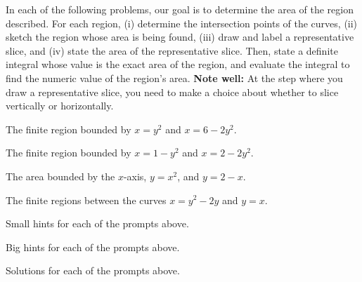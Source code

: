 \begin{activity} \label{A:6.1.2}  In each of the following problems, our goal is to determine the area of the region described.  For each region, (i) determine the intersection points of the curves, (ii) sketch the region whose area is being found, (iii) draw and label a representative slice, and (iv) state the area of the representative slice.  Then, state a definite integral whose value is the exact area of the region, and evaluate the integral to find the numeric value of the region's area.  {\bf Note well:} At the step where you draw a representative slice, you need to make a choice about whether to slice vertically or horizontally.
\ba
	\item The finite region bounded by $x=y^2$ and $x=6-2y^2$.
	\item The finite region bounded by $x=1-y^2$ and $x = 2-2y^2$.
	\item The area bounded by the $x$-axis, $y=x^2$, and $y=2-x$.
	\item The finite regions between the curves $x=y^2-2y$ and $y=x$.

\ea

\end{activity}
\begin{smallhint}
\ba
	\item Small hints for each of the prompts above.
\ea
\end{smallhint}
\begin{bighint}
\ba
	\item Big hints for each of the prompts above.
\ea
\end{bighint}
\begin{activitySolution}
\ba
	\item Solutions for each of the prompts above.
\ea
\end{activitySolution}
\aftera